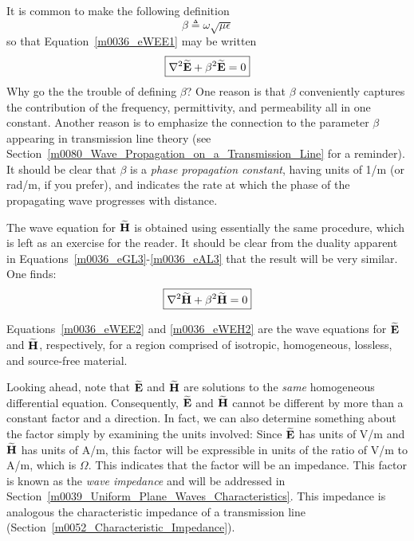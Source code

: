 It is common to make the following definition
%
\begin{equation}
\boxed{
\beta \triangleq \omega\sqrt{\mu\epsilon} 
}
\label{m0036_eBetaDef}
\end{equation} 
%
so that Equation~\ref{m0036_eWEE1} may be written
%
\begin{equation}
\boxed{
\nabla^2\widetilde{\bf E} +\beta^2 \widetilde{\bf E} = 0 
}
\label{m0036_eWEE2}
\end{equation}
%
Why go the the trouble of defining $\beta$?
One reason is that $\beta$ conveniently captures the contribution of the frequency, permittivity, and permeability all in one constant.
Another reason is to emphasize the connection to the parameter $\beta$ appearing in transmission line theory (see Section~\ref{m0080_Wave_Propagation_on_a_Transmission_Line} for a reminder).  
It should be clear that $\beta$ is a \emph{phase propagation constant}, 
having units of 1/m (or rad/m, if you prefer), and indicates the rate at which the phase of the propagating wave progresses with distance. 

The wave equation for $\widetilde{\bf H}$ is obtained using essentially the same procedure, which is left as an exercise for the reader. 
It should be clear from the duality 
apparent in Equations~\ref{m0036_eGL3}-\ref{m0036_eAL3} that the result will be very similar. 
One finds:
%
\begin{equation}
\boxed{
\nabla^2\widetilde{\bf H} +\beta^2 \widetilde{\bf H} = 0 
}
\label{m0036_eWEH2}
\end{equation}

\begin{mdframed}[backgroundcolor=yellow!20,nobreak=true] 
Equations~\ref{m0036_eWEE2} and \ref{m0036_eWEH2} are the wave equations for $\widetilde{\bf E}$ and $\widetilde{\bf H}$, respectively, for a region comprised of isotropic, homogeneous, lossless, and source-free material.
\end{mdframed}

Looking ahead, note that $\widetilde{\bf E}$ and $\widetilde{\bf H}$ are solutions to the \emph{same} homogeneous differential equation.  Consequently, $\widetilde{\bf E}$ and $\widetilde{\bf H}$ cannot be different by more than a constant factor and a direction.
In fact, we can also determine something about the factor simply by examining the units involved:  
Since $\widetilde{\bf E}$ has units of V/m and $\widetilde{\bf H}$ has units of A/m, this factor will be expressible in units of the ratio of V/m to A/m, which is $\Omega$.
This indicates that the factor will be an impedance.
This factor is known as the \emph{wave impedance} 
and will be addressed in Section~\ref{m0039_Uniform_Plane_Waves_Characteristics}.
This impedance is analogous the characteristic impedance of a transmission line (Section~\ref{m0052_Characteristic_Impedance}).

